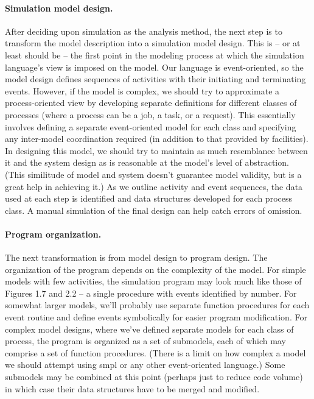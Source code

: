 \paragraph{Simulation model design.}
After deciding upon simulation as the analysis method, the next step is to
transform the model description into a simulation model design. This is -- or
at least should be -- the first point in the modeling process at which the
simulation language's view is imposed on the model. Our language is
event-oriented, so the model design defines sequences of activities with their
initiating and terminating events. However, if the model is complex, we
should try to approximate a process-oriented view by developing separate
definitions for different classes of processes (where a process can be a job, a
 task, or a request). This essentially involves defining a separate
 event-oriented model for each class and specifying any inter-model
coordination required (in addition to that provided by facilities). In
designing this model, we should try to maintain as much resemblance between
it and the system design as is reasonable at the model's level of abstraction.
(This similitude of model and system doesn't guarantee model validity, but is a
great help in achieving it.) As we outline activity and event sequences, the
data used at each step is identified and data structures developed for each
process class. A manual simulation of the final design can help catch errors
of omission.

\paragraph{Program organization.}
The next transformation is from model design to program design. The
organization of the program depends on the complexity of the model. For
simple models with few activities, the simulation program may look much like
those of Figures 1.7 and 2.2 -- a single procedure with events identified by
number. For somewhat larger models, we'll probably use separate function
procedures for each event routine and define events symbolically for easier
program modification. For complex model designs, where we've defined separate
models for each class of process, the program is organized as a set of
submodels, each of which may comprise a set of function procedures. (There is
 a limit on how complex a model we should attempt using smpl or any other
event-oriented language.) Some submodels may be combined at this point
(perhaps just to reduce code volume) in which case their data structures have
to be merged and modified.

